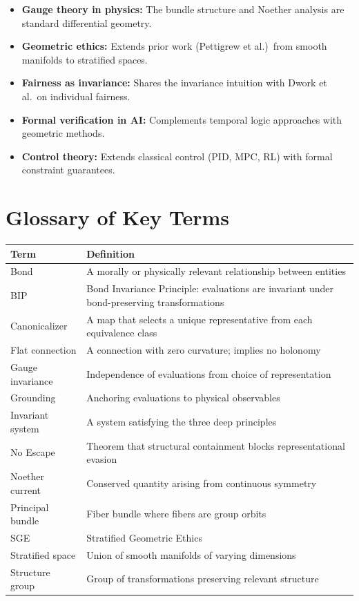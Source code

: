 \documentclass[12pt]{article}
\begin{document}
\begin{itemize}
    \item \textbf{Gauge theory in physics:} The bundle structure and Noether analysis are standard differential geometry.

    \item \textbf{Geometric ethics:} Extends prior work (Pettigrew et al.)\ from smooth manifolds to stratified spaces.

    \item \textbf{Fairness as invariance:} Shares the invariance intuition with Dwork et al.\ on individual fairness.

    \item \textbf{Formal verification in AI:} Complements temporal logic approaches with geometric methods.

    \item \textbf{Control theory:} Extends classical control (PID, MPC, RL) with formal constraint guarantees.
\end{itemize}

\section{Glossary of Key Terms}

\begin{table}[h]
\centering
\begin{tabular}{lp{10cm}}
\toprule
\textbf{Term} & \textbf{Definition} \\
\midrule
Bond & A morally or physically relevant relationship between entities \\
BIP & Bond Invariance Principle: evaluations are invariant under bond-preserving transformations \\
Canonicalizer & A map that selects a unique representative from each equivalence class \\
Flat connection & A connection with zero curvature; implies no holonomy \\
Gauge invariance & Independence of evaluations from choice of representation \\
Grounding & Anchoring evaluations to physical observables \\
Invariant system & A system satisfying the three deep principles \\
No Escape & Theorem that structural containment blocks representational evasion \\
Noether current & Conserved quantity arising from continuous symmetry \\
Principal bundle & Fiber bundle where fibers are group orbits \\
SGE & Stratified Geometric Ethics \\
Stratified space & Union of smooth manifolds of varying dimensions \\
Structure group & Group of transformations preserving relevant structure \\
\bottomrule
\end{tabular}
\end{table}
\end{document}
